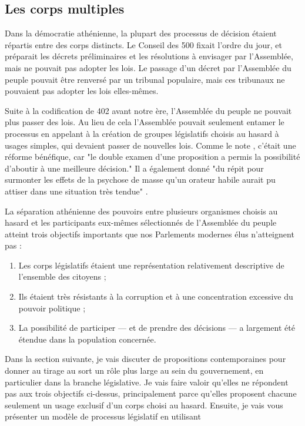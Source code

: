 \subsection{Les  corps multiples}
Dans la démocratie athénienne, la plupart des processus de décision
étaient répartis entre des corps distincts. Le Conseil des 500
fixait l'ordre du jour, et préparait les décrets préliminaires et les
résolutions à envisager par l'Assemblée, mais ne pouvait pas adopter
les lois. Le passage d'un décret par l'Assemblée du peuple pouvait
être renversé par un tribunal populaire, mais ces tribunaux ne
pouvaient pas adopter les lois elles-mêmes.\par
Suite à la codification de 402 avant notre ère, l'Assemblée du peuple
ne pouvait plus passer des lois. Au lieu de cela l'Assemblée pouvait
seulement entamer le processus en appelant à la création de groupes
législatifs choisis au hasard à usages simples, qui devaient passer de
nouvelles lois. Comme le note \cite{hans99}, c'était une réforme
bénéfique, car "le double examen d'une proposition a permis la
possibilité d'aboutir à une meilleure décision." Il a également donné
"du répit pour surmonter les effets de la psychose de masse qu'un
orateur habile aurait pu attiser dans une situation très tendue"
\cite{hans99}.\par 
La séparation athénienne des pouvoirs entre plusieurs organismes
choisis au hasard et les participants eux-mêmes sélectionnés de
l'Assemblée du peuple atteint trois objectifs importants que nos
Parlements modernes élus n'atteignent pas : 
\begin{enumerate}
\item Les corps législatifs étaient une représentation relativement
descriptive de l'ensemble des citoyens ;
\item Ils étaient très résistants à la corruption et à une concentration
excessive du pouvoir politique ;
\item La possibilité de participer --- et de prendre des décisions --- a
largement été étendue dans la population concernée.
\end{enumerate}
Dans la section suivante, je vais discuter de propositions
contemporaines pour donner au tirage au sort un rôle plus large au
sein du gouvernement, en particulier dans la branche législative. Je
vais faire valoir qu'elles ne répondent pas aux trois objectifs
ci-dessus, principalement parce qu'elles proposent chacune seulement un
usage exclusif d'un corps choisi au hasard. Ensuite, je vais vous
présenter un modèle de processus législatif en utilisant
